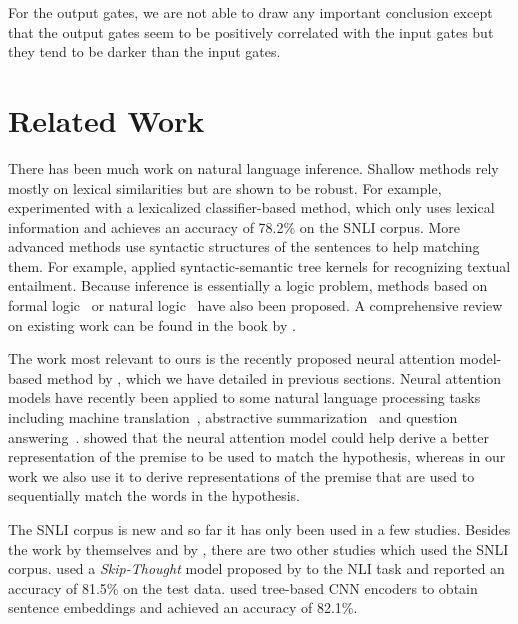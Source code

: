 \documentclass[11pt,letterpaper]{article}
\begin{document}
For the output gates, we are not able to draw any important conclusion except that the output gates seem to be positively correlated with the input gates but they tend to be darker than the input gates.



 \section{Related Work}

There has been much work on natural language inference.
Shallow methods rely mostly on lexical similarities but are shown to be robust.
For example,  experimented with a lexicalized classifier-based method, which only uses lexical information 
and achieves an accuracy of 78.2\% on the SNLI corpus.
More advanced methods use syntactic structures of the sentences to help matching them.
For example,  applied syntactic-semantic tree kernels for recognizing textual entailment.
Because inference is essentially a logic problem, methods based on formal logic~\cite{clark:tac09} or natural logic~\cite{maccartney:09} have also been proposed.
A comprehensive review on existing work 
can be found in the book by .

The work most relevant to ours is the recently proposed neural attention model-based method by , which we have detailed in previous sections.
Neural attention models have recently been applied to some natural language processing tasks including machine translation~\cite{bahdanau:icrl15}, abstractive summarization~\cite{rush2015neural} and question answering~\cite{hermann2015teaching}.
 showed that the neural attention model could help derive a better representation of the premise to be used to match the hypothesis, whereas in our work we also use it to derive representations of the premise that are used to sequentially match the words in the hypothesis.

The SNLI corpus is new and so far it has only been used in a few studies.
Besides the work by  themselves and by , there are two other studies which used the SNLI corpus.
 used a \emph{Skip-Thought} model proposed by  to the NLI task and reported an accuracy of 81.5\% on the test data.
 used tree-based CNN encoders to obtain sentence embeddings and achieved an accuracy of 82.1\%.
\end{document}
